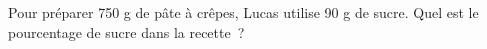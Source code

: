 \documentclass[exercice]{thedocument}%
\begin{document}
%
Pour préparer 750 g de pâte à crêpes, Lucas utilise 90 g de sucre.
\vskip5pt\noindent Quel est le pourcentage de sucre dans la recette~?
\end{document}
